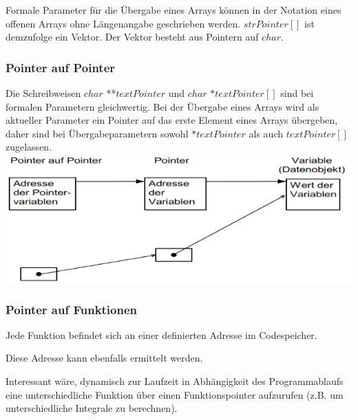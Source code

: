 			\begin{minipage}[c]{9 cm}
				
			\end{minipage}
			\hspace*{0.5cm}
			\begin{minipage}[c]{9 cm}
				Formale Parameter für die Übergabe eines Arrays können in der Notation eines offenen Arrays ohne Längenangabe geschrieben werden. $strPointer[]$ ist demzufolge ein Vektor. Der Vektor besteht aus Pointern auf $char$.
			\end{minipage}
			
		\subsubsection{Pointer auf Pointer }
			\begin{minipage}[t]{9 cm}
				\vspace*{-0.5cm}
			\end{minipage}
			\hspace*{0.5cm}
			\begin{minipage}[t]{9 cm}
				Die Schreibweisen $char$ **$textPointer$ und $char$ $*textPointer[]$ sind bei formalen Parametern gleichwertig. Bei der Übergabe eines Arrays wird als aktueller Parameter ein Pointer auf das erste Element eines Arrays übergeben, daher sind bei Übergabeparametern sowohl $*textPointer$ als auch $textPointer[]$ zugelassen. \\
				\includegraphics[width=1\textwidth]{pics/pointer_pointer.jpg}
			\end{minipage}
			
		\subsubsection{Pointer auf Funktionen }
			\begin{compactitem}
				\item Jede Funktion befindet sich an einer definierten Adresse im Codespeicher.
				\item Diese Adresse kann ebenfalls ermittelt werden.
				\item Interessant wäre, dynamisch zur Laufzeit in Abhängigkeit des Programmablaufs eine unterschiedliche Funktion über einen Funktionspointer aufzurufen (z.B. um unterschiedliche Integrale zu berechnen).
			\end{compactitem}
			

